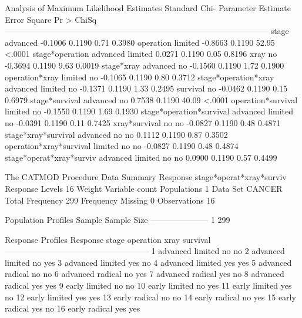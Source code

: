 \documentclass{article}
\begin{document}
\begin{Woutput}
                            Analysis of Maximum Likelihood Estimates
                                                              Standard        Chi-
Parameter                                          Estimate      Error      Square    Pr > ChiSq
------------------------------------------------------------------------------------------------
stage                    advanced                   -0.1006     0.1190        0.71        0.3980
operation                limited                    -0.8663     0.1190       52.95        <.0001
stage*operation          advanced limited            0.0271     0.1190        0.05        0.8196
xray                     no                         -0.3694     0.1190        9.63        0.0019
stage*xray               advanced no                -0.1560     0.1190        1.72        0.1900
operation*xray           limited no                 -0.1065     0.1190        0.80        0.3712
stage*operation*xray     advanced limited no        -0.1371     0.1190        1.33        0.2495
survival                 no                         -0.0462     0.1190        0.15        0.6979
stage*survival           advanced no                 0.7538     0.1190       40.09        <.0001
operation*survival       limited no                 -0.1550     0.1190        1.69        0.1930
stage*operation*survival advanced limited no        -0.0391     0.1190        0.11        0.7425
xray*survival            no no                      -0.0827     0.1190        0.48        0.4871
stage*xray*survival      advanced no no              0.1112     0.1190        0.87        0.3502
operation*xray*survival  limited no no              -0.0827     0.1190        0.48        0.4874
stage*operat*xray*surviv advanced limited no no      0.0900     0.1190        0.57        0.4499

The CATMOD Procedure
                            Data Summary
Response           stage*operat*xray*surviv     Response Levels   16
Weight Variable    count                        Populations        1
Data Set           CANCER                       Total Frequency  299
Frequency Missing  0                            Observations      16

 Population Profiles
Sample    Sample Size
---------------------
    1             299

                  Response Profiles
Response    stage       operation    xray    survival
-----------------------------------------------------
    1       advanced    limited      no      no
    2       advanced    limited      no      yes
    3       advanced    limited      yes     no
    4       advanced    limited      yes     yes
    5       advanced    radical      no      no
    6       advanced    radical      no      yes
    7       advanced    radical      yes     no
    8       advanced    radical      yes     yes
    9       early       limited      no      no
   10       early       limited      no      yes
   11       early       limited      yes     no
   12       early       limited      yes     yes
   13       early       radical      no      no
   14       early       radical      no      yes
   15       early       radical      yes     no
   16       early       radical      yes     yes


\end{Woutput}
\end{document}
